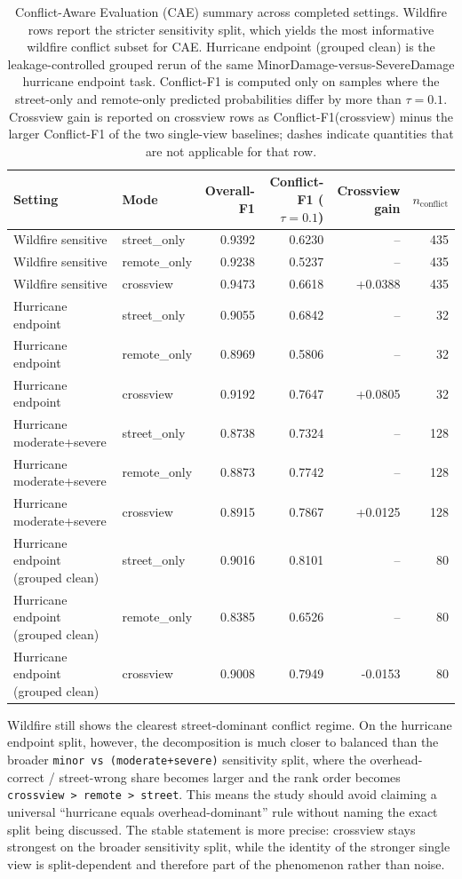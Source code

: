 \documentclass[sigconf]{acmart}
\begin{document}
\begin{table}[!tbp]
  \caption{Conflict-Aware Evaluation (CAE) summary across completed settings. Wildfire rows report the stricter sensitivity split, which yields the most informative wildfire conflict subset for CAE. Hurricane endpoint (grouped clean) is the leakage-controlled grouped rerun of the same MinorDamage-versus-SevereDamage hurricane endpoint task. Conflict-F1 is computed only on samples where the street-only and remote-only predicted probabilities differ by more than $\tau=0.1$. Crossview gain is reported on crossview rows as Conflict-F1(crossview) minus the larger Conflict-F1 of the two single-view baselines; dashes indicate quantities that are not applicable for that row.}
  \label{tab:cae}
  \centering
  \begin{tabular}{llrrrr}
    \toprule
    Setting & Mode & Overall-F1 & Conflict-F1 ($\tau=0.1$) & Crossview gain & $n_{\mathrm{conflict}}$ \\
    \midrule
    Wildfire sensitive & street\_only & 0.9392 & 0.6230 & -- & 435 \\
    Wildfire sensitive & remote\_only & 0.9238 & 0.5237 & -- & 435 \\
    Wildfire sensitive & crossview & 0.9473 & 0.6618 & +0.0388 & 435 \\
    Hurricane endpoint & street\_only & 0.9055 & 0.6842 & -- & 32 \\
    Hurricane endpoint & remote\_only & 0.8969 & 0.5806 & -- & 32 \\
    Hurricane endpoint & crossview & 0.9192 & 0.7647 & +0.0805 & 32 \\
    Hurricane moderate+severe & street\_only & 0.8738 & 0.7324 & -- & 128 \\
    Hurricane moderate+severe & remote\_only & 0.8873 & 0.7742 & -- & 128 \\
    Hurricane moderate+severe & crossview & 0.8915 & 0.7867 & +0.0125 & 128 \\
    Hurricane endpoint (grouped clean) & street\_only & 0.9016 & 0.8101 & -- & 80 \\
    Hurricane endpoint (grouped clean) & remote\_only & 0.8385 & 0.6526 & -- & 80 \\
    Hurricane endpoint (grouped clean) & crossview & 0.9008 & 0.7949 & -0.0153 & 80 \\
    \bottomrule
  \end{tabular}
\end{table}

Wildfire still shows the clearest street-dominant conflict regime. On the
hurricane endpoint split, however, the decomposition is much closer to balanced
than the broader \texttt{minor vs (moderate+severe)} sensitivity split, where
the overhead-correct / street-wrong share becomes larger and the rank order
becomes \texttt{crossview > remote > street}. This means the study should
avoid claiming a universal ``hurricane equals overhead-dominant'' rule without
naming the exact split being discussed. The stable statement is more precise:
crossview stays strongest on the broader sensitivity split, while the identity
of the stronger single view is split-dependent and therefore part of the
phenomenon rather than noise.
\end{document}
